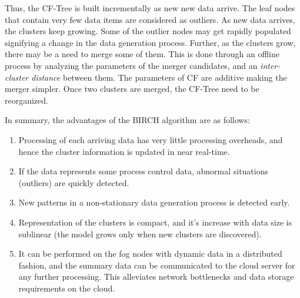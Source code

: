 \noindent
Thus, the CF-Tree is built incrementally as new new data arrive. The leaf nodes that contain very few data items are considered as
outliers. As new data arrives, the clusters keep growing. Some of the outlier nodes may get rapidly populated signifying a change
in the data generation process. Further, as the clusters grow, there may be a need to merge some of them. This is done through an 
offline process by analyzing the parameters of the merger candidates, and an {\em inter-cluster distance} between them. The parameters 
of CF are additive making the merger simpler. 
Once two clusters are merged, the CF-Tree need to be reorganized.

\noindent
{}
In summary, the advantages of the BIRCH algorithm are as follows:

\begin{enumerate}
	\item Processing of each arriving data has very little processing overheads, and hence the cluster information is 
		updated in near real-time. 
	\item If the data represents some process control data, abnormal situations (outliers) are quickly detected.
	\item New patterns in a non-stationary data generation process is detected early. 
	\item Representation of the clusters is compact, and it's increase with data size is sublinear (the model grows only
		when new clusters are discovered).
	\item It can be performed on the fog nodes with dynamic data in a distributed fashion, and the summary data can be 
		communicated to the cloud server for any further processing. This alleviates network bottlenecks and data
		storage requirements on the cloud.
\end{enumerate}

